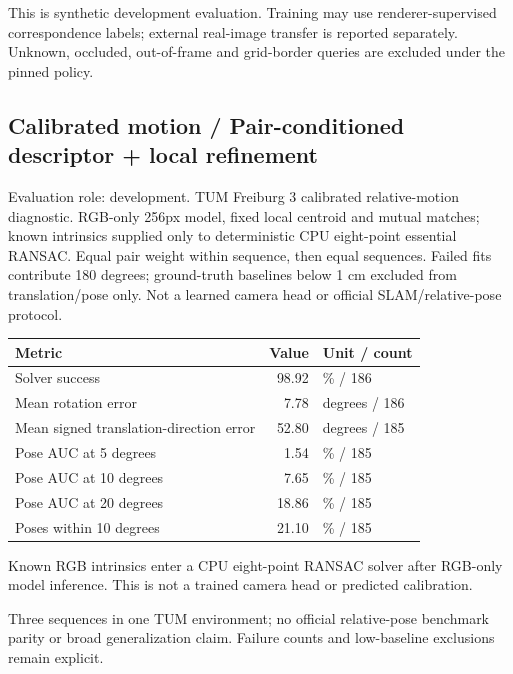 \documentclass[10pt]{article}
\begin{document}
This is synthetic development evaluation. Training may use renderer-supervised correspondence labels; external real-image transfer is reported separately. Unknown, occluded, out-of-frame and grid-border queries are excluded under the pinned policy.

\subsection{Calibrated motion / Pair-conditioned descriptor + local refinement}
Evaluation role: development. TUM Freiburg 3 calibrated relative-motion diagnostic. RGB-only 256px model, fixed local centroid and mutual matches; known intrinsics supplied only to deterministic CPU eight-point essential RANSAC. Equal pair weight within sequence, then equal sequences. Failed fits contribute 180 degrees; ground-truth baselines below 1 cm excluded from translation/pose only. Not a learned camera head or official SLAM/relative-pose protocol.
\begin{center}\begin{tabular}{p{.57\linewidth}rp{.23\linewidth}}\toprule Metric & Value & Unit / count \\ \midrule
Solver success & 98.92 & \% / 186 \\
Mean rotation error & 7.78 & degrees / 186 \\
Mean signed translation-direction error & 52.80 & degrees / 185 \\
Pose AUC at 5 degrees & 1.54 & \% / 185 \\
Pose AUC at 10 degrees & 7.65 & \% / 185 \\
Pose AUC at 20 degrees & 18.86 & \% / 185 \\
Poses within 10 degrees & 21.10 & \% / 185 \\
\bottomrule\end{tabular}\end{center}
Known RGB intrinsics enter a CPU eight-point RANSAC solver after RGB-only model inference. This is not a trained camera head or predicted calibration.

Three sequences in one TUM environment; no official relative-pose benchmark parity or broad generalization claim. Failure counts and low-baseline exclusions remain explicit.
\end{document}

